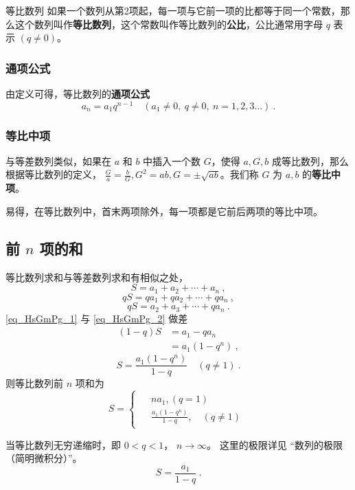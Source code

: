 

\begin{definition}{等比数列}
如果一个数列从第2项起，每一项与它前一项的比都等于同一个常数，那么这个数列叫作\textbf{等比数列}，这个常数叫作等比数列的\textbf{公比}，公比通常用字母 $q$ 表示 $(q\ne 0)$。
\end{definition}

\subsubsection{通项公式}
由定义可得，等比数列的\textbf{通项公式}
\begin{equation}
a_n = a_1 q^{n-1} \quad (a_1 \ne 0,\ q\ne 0,\ n=1,2,3\dots)~.
\end{equation}

\subsubsection{等比中项}
与等差数列类似，如果在 $a$ 和 $b$ 中插入一个数 $G$，使得 $a,G,b$ 成等比数列，那么根据等比数列的定义， $\frac{G}{a} = \frac{b}{G},G^2 = ab,G = \pm \sqrt{ab}$。我们称 $G$ 为 $a,b$ 的\textbf{等比中项}。

易得，在等比数列中，首末两项除外，每一项都是它前后两项的等比中项。

\subsection{前 $n$ 项的和}
等比数列求和与等差数列求和有相似之处，
\begin{equation}\label{eq_HsGmPg_1}
S = a_1 + a_2 + \cdots + a_n~,
\end{equation}
\begin{equation}
qS = qa_1 + qa_2 + \cdots + qa_n~,
\end{equation}
\begin{equation}\label{eq_HsGmPg_2}
qS= a_2 + a_3 + \cdots + qa_n~.
\end{equation}
\autoref{eq_HsGmPg_1} 与 \autoref{eq_HsGmPg_2} 做差
\begin{equation}
\begin{aligned}
(1 - q)S &= a_1 - qa_n\\
&= a_1(1 - q^n)~,
\end{aligned}
\end{equation}
\begin{equation}
S = \frac{a_1(1-q^n)}{1-q} \quad (q\neq 1)~.
\end{equation}
则等比数列前 $n$ 项和为
\begin{equation}
S = 
\begin{cases}
\begin{aligned}
&na_1,(q = 1) \\
&\frac{a_1(1-q^n)}{1-q},\quad (q \neq 1)
\end{aligned}
\end{cases}
\end{equation}

当等比数列无穷递缩时，即 $0<q<1$， $n\rightarrow \infty$。 这里的极限详见 “数列的极限（简明微积分）”。
\begin{equation}
S = \frac{a_1}{1 - q}~.
\end{equation}
